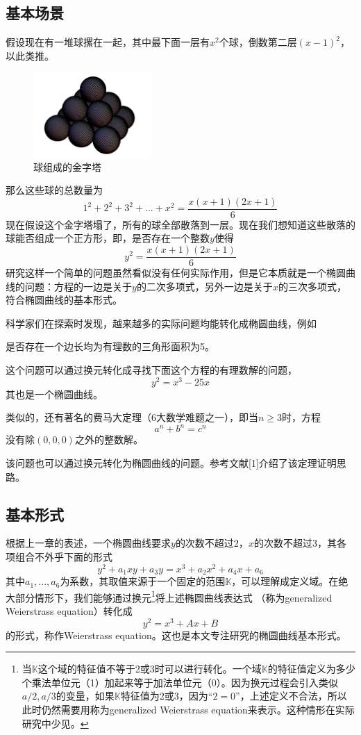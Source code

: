 \documentclass[12pt]{article}
\newcommand{\ec}{椭圆曲线}
\begin{document}
\subsection{基本场景}
假设现在有一堆球摞在一起，其中最下面一层有$x^2$个球，倒数第二层$(x-1)^2$，以此类推。
\begin{figure}[H]
	\centering
	\label{fig:balls}
	\includegraphics[width=0.4\textwidth]{../common/ball.png}
	\caption{球组成的金字塔}
\end{figure}
那么这些球的总数量为
$$1^2+2^2+3^2+...+x^2=\frac{x(x+1)(2x+1)}{6}$$
现在假设这个金字塔塌了，所有的球全部散落到一层。现在我们想知道这些散落的球能否组成一个正方形，即，是否存在一个整数$y$使得
$$y^2=\frac{x(x+1)(2x+1)}{6}$$
研究这样一个简单的问题虽然看似没有任何实际作用，但是它本质就是一个椭圆曲线的问题：方程的一边是关于$y$的二次多项式，另外一边是关于$x$的三次多项式，符合\ec 的基本形式。

科学家们在探索时发现，越来越多的实际问题均能转化成\ec ，例如

是否存在一个边长均为有理数的三角形面积为5。

这个问题可以通过换元转化成寻找下面这个方程的有理数解的问题，
$$y^2=x^3-25x$$
其也是一个椭圆曲线。

类似的，还有著名的费马大定理（6大数学难题之一），即当$n\geq 3$时，方程
$$a^n+b^n = c^n$$
没有除$(0,0,0)$之外的整数解。

该问题也可以通过换元转化为\ec 的问题。参考文献[1]介绍了该定理证明思路。
\subsection{基本形式}
根据上一章的表述，一个椭圆曲线要求$y$的次数不超过2，$x$的次数不超过3，其各项组合不外乎下面的形式
$$ y^2+a_1xy+a_3y=x^3+a_2x^2+a_4x+a_6$$
其中$a_1,...,a_6$为系数，其取值来源于一个固定的范围$\mathbb{K}$，可以理解成定义域。在绝大部分情形下，我们能够通过换元\footnote{当$\mathbb{K}$这个域的特征值不等于2或3时可以进行转化。一个域$\mathbb{K}$的特征值定义为多少个乘法单位元（1）加起来等于加法单位元（0）。因为换元过程会引入类似$a/2,a/3$的变量，如果$\mathbb{K}$特征值为2或3，因为“$2=0$”，上述定义不合法，所以此时仍然需要用称为generalized Weierstrass equation来表示。这种情形在实际研究中少见。}将上述\ec 表达式 （称为generalized Weierstrass equation）转化成
$$y^2=x^3+Ax+B$$
的形式，称作Weierstrass equation。这也是本文专注研究的椭圆曲线基本形式。
\end{document}
